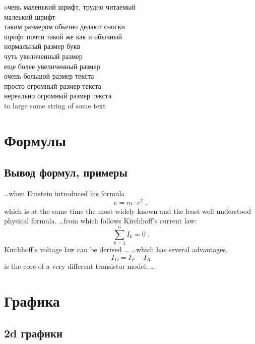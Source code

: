 \documentclass[a4paper,14pt]{book}
\begin{document}
\tiny oчень маленький шрифт, трудно читаемый \\
\scriptsize малеький шрифт \\
\footnotesize таким размером обычно делают сноски \\
\small шрифт почти такой же как и обычный \\
\normalsize нормальный размер букв \\
\large чуть увеличенный размер \\
\Large еще более увеличенный размер \\
\LARGE очень большой размер текста \\
\huge просто огромный размер текста \\
\Huge нереально огромный размер текста \\
\Huge to large some string of some text \\
\normalsize

\section{Формулы}

\subsection{Вывод формул, примеры}
\ldots when Einstein introduced his formula
\begin{equation}
	e = m \cdot c^2 \; ,
\end{equation}
which is at the same time the most widely known
and the least well understood physical formula.
\ldots from which follows Kirchhoff's current law:
\begin{equation}
	\sum_{k=1}^{n} I_k = 0 \; .
\end{equation}
Kirchhoff's voltage law can be derived \ldots
\ldots which has several advantages.
\begin{equation}
	I_D = I_F - I_R
\end{equation}
is the core of a very different transistor model. \ldots

\section{Графика}

\subsection{2d графики}
\end{document}
